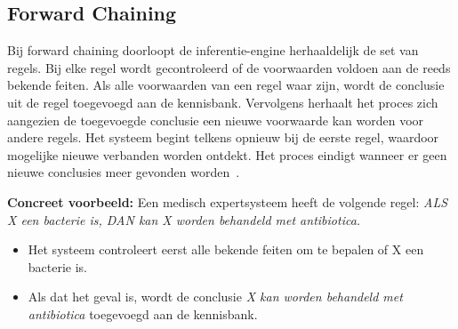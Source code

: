 \subsection{Forward Chaining}
Bij forward chaining doorloopt de inferentie-engine herhaaldelijk de set van regels. Bij elke regel wordt gecontroleerd of de voorwaarden voldoen aan de reeds bekende feiten. Als alle voorwaarden van een regel waar zijn, wordt de conclusie uit de regel toegevoegd aan de kennisbank. Vervolgens herhaalt het proces zich aangezien de toegevoegde conclusie een nieuwe voorwaarde kan worden voor andere regels. Het systeem begint telkens opnieuw bij de eerste regel, waardoor mogelijke nieuwe verbanden worden ontdekt. Het proces eindigt wanneer er geen nieuwe conclusies meer gevonden worden~\autocite{Neapolitan1986}.\par
\medskip
\textbf{Concreet voorbeeld:}
Een medisch expertsysteem heeft de volgende regel: \textit{ALS X een bacterie is, DAN kan X worden behandeld met antibiotica.}
\begin{itemize}
    \item Het systeem controleert eerst alle bekende feiten om te bepalen of X een bacterie is.
    \item Als dat het geval is, wordt de conclusie \textit{X kan worden behandeld met antibiotica} toegevoegd aan de kennisbank.
\end{itemize}

